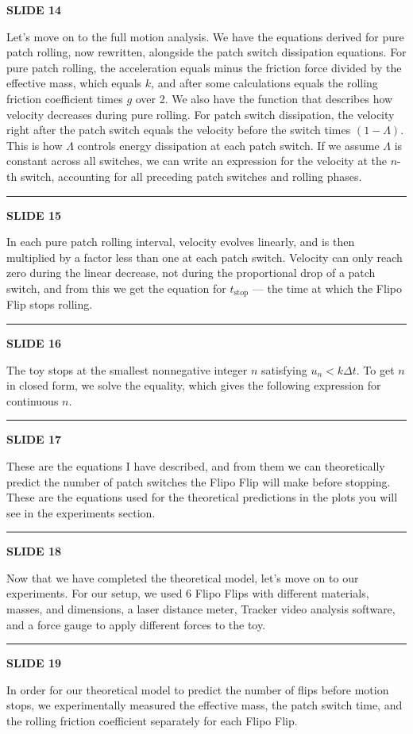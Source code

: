 \documentclass[a4paper,11pt]{article}
\newcommand{\slidetitle}[1]{{\small\textbf{SLIDE #1}}\par\smallskip}
\newcommand{\slidedivider}{\vspace{0.7em}\noindent\rule{\textwidth}{0.4pt}\vspace{0.7em}}
\begin{document}
\slidetitle{14}
Let's move on to the full motion analysis. We have the equations derived for pure patch rolling, now rewritten, alongside the patch switch dissipation equations. For pure patch rolling, the acceleration equals minus the friction force divided by the effective mass, which equals $k$, and after some calculations equals the rolling friction coefficient times $g$ over 2. We also have the function that describes how velocity decreases during pure rolling. For patch switch dissipation, the velocity right after the patch switch equals the velocity before the switch times $(1 - \Lambda)$. This is how $\Lambda$ controls energy dissipation at each patch switch. If we assume $\Lambda$ is constant across all switches, we can write an expression for the velocity at the $n$-th switch, accounting for all preceding patch switches and rolling phases.

\slidedivider

\slidetitle{15}
In each pure patch rolling interval, velocity evolves linearly, and is then multiplied by a factor less than one at each patch switch. Velocity can only reach zero during the linear decrease, not during the proportional drop of a patch switch, and from this we get the equation for $t_{\mathrm{stop}}$ --- the time at which the Flipo Flip stops rolling.

\slidedivider

\slidetitle{16}
The toy stops at the smallest nonnegative integer $n$ satisfying $u_n < k\Delta t$. To get $n$ in closed form, we solve the equality, which gives the following expression for continuous $n$.

\slidedivider

\slidetitle{17}
These are the equations I have described, and from them we can theoretically predict the number of patch switches the Flipo Flip will make before stopping. These are the equations used for the theoretical predictions in the plots you will see in the experiments section.

\slidedivider

\slidetitle{18}
Now that we have completed the theoretical model, let's move on to our experiments. For our setup, we used 6 Flipo Flips with different materials, masses, and dimensions, a laser distance meter, Tracker video analysis software, and a force gauge to apply different forces to the toy.

\slidedivider

\slidetitle{19}
In order for our theoretical model to predict the number of flips before motion stops, we experimentally measured the effective mass, the patch switch time, and the rolling friction coefficient separately for each Flipo Flip.
\end{document}
